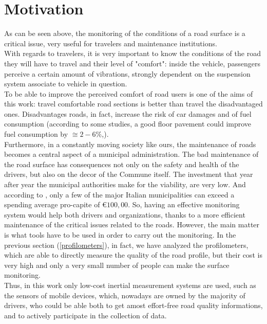 \documentclass{standalone}
\begin{document}
\clearpage
	\section{Motivation}\label{Motivation}
\noindent
As can be seen above, the monitoring of the conditions of a road surface is a critical issue, very useful for travelers and maintenance institutions.\\
With regards to travelers, it is very important to know the conditions of the road they will have to travel and their level of "comfort": inside the vehicle, passengers perceive a certain amount of vibrations, strongly dependent on the suspension system associate to vehicle in question.\\
To be able to improve the perceived comfort of road users is one of the aims of this work: travel comfortable road sections is better than travel the disadvantaged ones. Disadvantages roads, in fact, increase the risk of car damages and of fuel consumption (according to some studies, a good floor pavement could improve fuel consumption by $\displaystyle{\cong{2-6\%}}$\cite{jackson2011synthesis},\cite{jointeapa}).\\
Furthermore, in a constantly moving society like ours, the maintenance of roads becomes a central aspect of a municipal administration. The bad maintenance of the road surface has consequences not only on the safety and health of the drivers, but also on the decor of the Commune itself. 
The investment that year after year the municipal authorities make for the viability, are very low. And according to \cite{piemonte2013finanza}, only a few of the major Italian municipalities can exceed a spending average pro-capite of $\displaystyle{\euro 100,00}$.
So, having an effective monitoring system would help both drivers and organizations, thanks to a more efficient maintenance of the critical issues related to the roads.
However, the main matter is what tools have to be used in order to carry out the monitoring. In the previous section (\ref{profilometers}), in fact, we have analyzed the profilometers, which are able to directly measure the quality of the road profile, but their cost is very high and only a very small number of people can make the surface monitoring. \\Thus, in this work only low-cost inertial measurement systems are used, such as the sensors of mobile devices, which, nowadays are owned by the majority of drivers, who could be able both to get amost effort-free road quality informations, and to actively participate in the collection of data.
\end{document}
